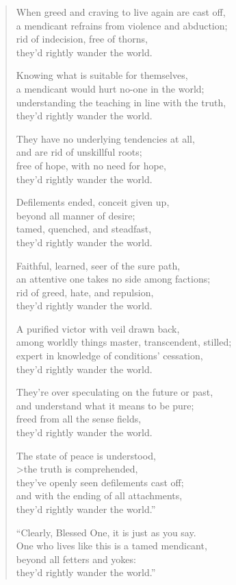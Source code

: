 \documentclass[12pt,openany]{book}%
\begin{document}
\begin{verse}
When greed and craving to live again are cast off, \\
a mendicant refrains from violence and abduction; \\
rid of indecision, free of thorns, \\
they’d rightly wander the world. 

Knowing what is suitable for themselves, \\
a mendicant would hurt no-one in the world; \\
understanding the teaching in line with the truth, \\
they’d rightly wander the world. 

They have no underlying tendencies at all, \\
and are rid of unskillful roots; \\
free of hope, with no need for hope, \\
they’d rightly wander the world. 

Defilements ended, conceit given up, \\
beyond all manner of desire; \\
tamed, quenched, and steadfast, \\
they’d rightly wander the world. 

Faithful, learned, seer of the sure path, \\
an attentive one takes no side among factions; \\
rid of greed, hate, and repulsion, \\
they’d rightly wander the world. 

A purified victor with veil drawn back, \\
among worldly things master, transcendent, stilled; \\
expert in knowledge of conditions’ cessation, \\
they’d rightly wander the world. 

They’re over speculating on the future or past, \\
and understand what it means to be pure; \\
freed from all the sense fields, \\
they’d rightly wander the world. 

The state of peace is understood, \\>the truth is comprehended, \\
they’ve openly seen defilements cast off; \\
and with the ending of all attachments, \\
they’d rightly wander the world.” 

“Clearly, Blessed One, it is just as you say. \\
One who lives like this is a tamed mendicant, \\
beyond all fetters and yokes: \\
they’d rightly wander the world.” 

%
\end{verse}
\end{document}
